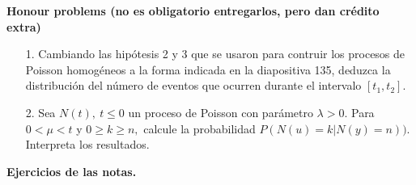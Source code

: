 \documentclass[11pt,letterpaper]{article}
\begin{document}
\textbf{Honour problems (no es obligatorio entregarlos, pero dan crédito extra)}\\

\begin{itemize}
\item[1.] Cambiando las hipótesis 2 y 3 que se usaron para contruir los procesos de Poisson homogéneos
a la forma indicada en la diapositiva 135, deduzca la distribución del número de eventos que
ocurren durante el intervalo $[t_1 , t_2]$.

\item[2.] Sea $N(t), \ t\leq 0$ un proceso de Poisson con parámetro $\lambda >0$. Para $0<\mu <t$ y $0\geq k\geq n,$ calcule la probabilidad $P(N(u)=k|N(y)=n)).$ Interpreta los resultados.
\end{itemize}

\textbf{Ejercicios de las notas. }
\end{document}
